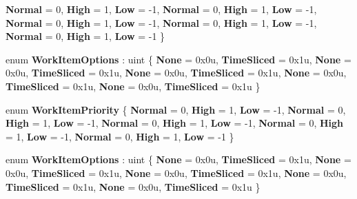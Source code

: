 \begin{DoxyCompactItemize}
{\bfseries Normal} = 0, 
{\bfseries High} = 1, 
{\bfseries Low} = -\/1, 
{\bfseries Normal} = 0, 
\newline
{\bfseries High} = 1, 
{\bfseries Low} = -\/1, 
{\bfseries Normal} = 0, 
{\bfseries High} = 1, 
\newline
{\bfseries Low} = -\/1, 
{\bfseries Normal} = 0, 
{\bfseries High} = 1, 
{\bfseries Low} = -\/1, 
\newline
{\bfseries Normal} = 0, 
{\bfseries High} = 1, 
{\bfseries Low} = -\/1
 \}
\item 
\mbox{\label{namespace_windows_1_1_system_1_1_threading_a94947e61a137a08a7882cdb6eb9afa18}} 
enum {\bfseries Work\+Item\+Options} \+: uint \{ \newline
{\bfseries None} = 0x0u, 
{\bfseries Time\+Sliced} = 0x1u, 
{\bfseries None} = 0x0u, 
{\bfseries Time\+Sliced} = 0x1u, 
\newline
{\bfseries None} = 0x0u, 
{\bfseries Time\+Sliced} = 0x1u, 
{\bfseries None} = 0x0u, 
{\bfseries Time\+Sliced} = 0x1u, 
\newline
{\bfseries None} = 0x0u, 
{\bfseries Time\+Sliced} = 0x1u
 \}
\item 
\mbox{\label{namespace_windows_1_1_system_1_1_threading_a6d436d8ad69b6001b82160043badf06a}} 
enum {\bfseries Work\+Item\+Priority} \{ \newline
{\bfseries Normal} = 0, 
{\bfseries High} = 1, 
{\bfseries Low} = -\/1, 
{\bfseries Normal} = 0, 
\newline
{\bfseries High} = 1, 
{\bfseries Low} = -\/1, 
{\bfseries Normal} = 0, 
{\bfseries High} = 1, 
\newline
{\bfseries Low} = -\/1, 
{\bfseries Normal} = 0, 
{\bfseries High} = 1, 
{\bfseries Low} = -\/1, 
\newline
{\bfseries Normal} = 0, 
{\bfseries High} = 1, 
{\bfseries Low} = -\/1
 \}
\item 
\mbox{\label{namespace_windows_1_1_system_1_1_threading_a94947e61a137a08a7882cdb6eb9afa18}} 
enum {\bfseries Work\+Item\+Options} \+: uint \{ \newline
{\bfseries None} = 0x0u, 
{\bfseries Time\+Sliced} = 0x1u, 
{\bfseries None} = 0x0u, 
{\bfseries Time\+Sliced} = 0x1u, 
\newline
{\bfseries None} = 0x0u, 
{\bfseries Time\+Sliced} = 0x1u, 
{\bfseries None} = 0x0u, 
{\bfseries Time\+Sliced} = 0x1u, 
\newline
{\bfseries None} = 0x0u, 
{\bfseries Time\+Sliced} = 0x1u
 \}
\end{DoxyCompactItemize}
